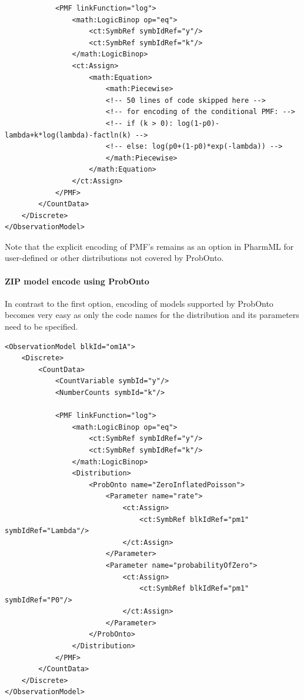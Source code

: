 {\begin{lstlisting}
            <PMF linkFunction="log">
                <math:LogicBinop op="eq">
                    <ct:SymbRef symbIdRef="y"/>
                    <ct:SymbRef symbIdRef="k"/>
                </math:LogicBinop>
                <ct:Assign>
                    <math:Equation>
                        <math:Piecewise>
                        <!-- 50 lines of code skipped here -->
                        <!-- for encoding of the conditional PMF: -->
                        <!-- if (k > 0): log(1-p0)-lambda+k*log(lambda)-factln(k) -->
                        <!-- else: log(p0+(1-p0)*exp(-lambda)) -->
                        </math:Piecewise>
                    </math:Equation>
                </ct:Assign>
            </PMF>
        </CountData>
    </Discrete>
</ObservationModel>
\end{lstlisting}
Note that \marginpar{\HandCuffLeft} the explicit encoding of PMF's remains
as an option in PharmML for user-defined or other distributions not covered by ProbOnto.
        
\paragraph{ZIP model encode using ProbOnto}
In contrast to the first option, encoding of models supported by ProbOnto
becomes very easy as only the code names for the distribution and its parameters 
need to be specified.

\lstset{language=XML}
\begin{lstlisting}
<ObservationModel blkId="om1A">
    <Discrete>
        <CountData>
            <CountVariable symbId="y"/>
            <NumberCounts symbId="k"/>
            
            <PMF linkFunction="log">
                <math:LogicBinop op="eq">
                    <ct:SymbRef symbIdRef="y"/>
                    <ct:SymbRef symbIdRef="k"/>
                </math:LogicBinop>
                <Distribution>
                    <ProbOnto name="ZeroInflatedPoisson">
                        <Parameter name="rate">
                            <ct:Assign>
                                <ct:SymbRef blkIdRef="pm1" symbIdRef="Lambda"/>
                            </ct:Assign>
                        </Parameter>
                        <Parameter name="probabilityOfZero">
                            <ct:Assign>
                                <ct:SymbRef blkIdRef="pm1" symbIdRef="P0"/>
                            </ct:Assign>
                        </Parameter>
                    </ProbOnto>
                </Distribution>
            </PMF>
        </CountData>
    </Discrete>
</ObservationModel>\end{lstlisting}

}
